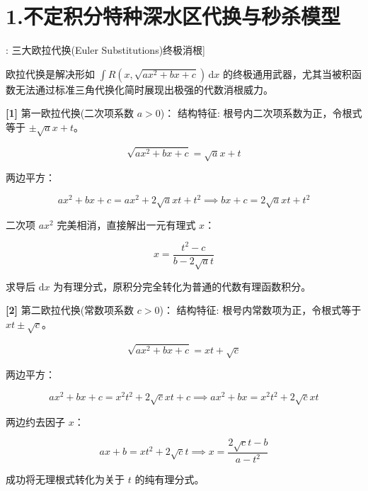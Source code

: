 \documentclass[11pt,a4paper,UTF8]{ctexart}
\begin{document}
\section{1.不定积分特种深水区代换与秒杀模型}

\begin{thmbox}[模型[1]: 三大欧拉代换(Euler Substitutions)终极消根]

欧拉代换是解决形如 $\int R(x, \sqrt{ax^2+bx+c})\,\mathrm{d}x$ 的终极通用武器，尤其当被积函数无法通过标准三角代换化简时展现出极强的代数消根威力。

\textbf{[1]} 第一欧拉代换(二次项系数 $a > 0$)：
结构特征: 根号内二次项系数为正，令根式等于 $\pm\sqrt{a}x + t$。


\begin{equation*}
\sqrt{ax^2+bx+c} = \sqrt{a}x + t
\end{equation*}


两边平方：


\begin{equation*}
ax^2 + bx + c = ax^2 + 2\sqrt{a}xt + t^2 \implies bx + c = 2\sqrt{a}xt + t^2
\end{equation*}


二次项 $ax^2$ 完美相消，直接解出一元有理式 $x$：


\begin{equation*}
x = \frac{t^2 - c}{b - 2\sqrt{a}t}
\end{equation*}


求导后 $\mathrm{d}x$ 为有理分式，原积分完全转化为普通的代数有理函数积分。

\textbf{[2]} 第二欧拉代换(常数项系数 $c > 0$)：
结构特征: 根号内常数项为正，令根式等于 $xt \pm \sqrt{c}$。


\begin{equation*}
\sqrt{ax^2+bx+c} = xt + \sqrt{c}
\end{equation*}


两边平方：


\begin{equation*}
ax^2 + bx + c = x^2 t^2 + 2\sqrt{c}xt + c \implies ax^2 + bx = x^2 t^2 + 2\sqrt{c}xt
\end{equation*}


两边约去因子 $x$：


\begin{equation*}
ax + b = xt^2 + 2\sqrt{c}t \implies x = \frac{2\sqrt{c}t - b}{a - t^2}
\end{equation*}


成功将无理根式转化为关于 $t$ 的纯有理分式。


\end{thmbox}
\end{document}
